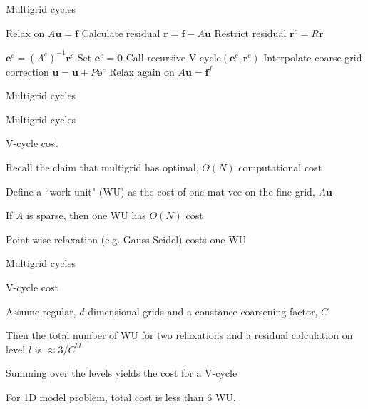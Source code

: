 \documentclass[18pt,xcolor=table]{beamer}
\begin{document}
\begin{frame}{Multigrid cycles}

\begin{algorithm}[H]
\caption{Recursive V-cycle$(\mathbf{u},\mathbf{f})$}
\begin{algorithmic}
\State Relax on $A\mathbf{u} = \mathbf{f}$
\State Calculate residual $\mathbf{r} = \mathbf{f} - A\mathbf{u}$
\State Restrict residual $\mathbf{r}^c = R\mathbf{r}$

\State $\mathbf{e}^c = (A^c)^{-1}\mathbf{r}^c$
\Else
\State Set $\mathbf{e}^c = \mathbf{0}$
\State Call recursive V-cycle$(\mathbf{e}^c, \mathbf{r}^c)$
\EndIf
\State Interpolate coarse-grid correction $\mathbf{u} = \mathbf{u} + P\mathbf{e}^c$
\State Relax again on $A\mathbf{u} = \mathbf{f}^f$
\end{algorithmic}
\end{algorithm}
\end{frame}

\begin{frame}{Multigrid cycles}
\begin{center}
\end{center}
\end{frame}

\begin{frame}{Multigrid cycles}
\begin{block}{V-cycle cost}
\bit
\item Recall the claim that multigrid has optimal, $O(N)$ computational cost
\item Define a ``work unit" (WU) as the cost of one mat-vec on the fine grid, $A\mathbf{u}$
\item If $A$ is sparse, then one WU has $O(N)$ cost
\item Point-wise relaxation (e.g. Gauss-Seidel) costs one WU
\eit
\end{block}
\end{frame}

\begin{frame}{Multigrid cycles}
\begin{block}{V-cycle cost}
\bit
\item Assume regular, $d$-dimensional grids and a constance coarsening factor, $C$
\item Then the total number of WU for two relaxations and a residual calculation on level $l$ is $\approx 3/C^{ld}$
\item Summing over the levels yields the cost for a V-cycle
\item For 1D model problem, total cost is less than 6 WU.
\eit
\end{block}
\end{frame}
\end{document}

